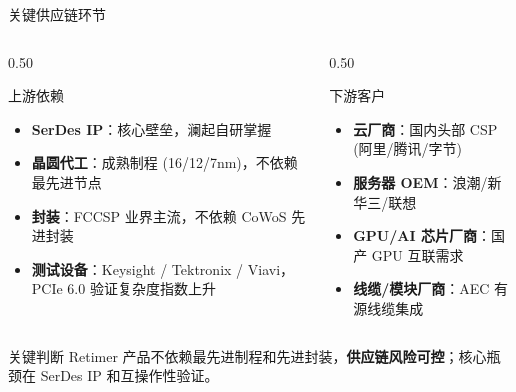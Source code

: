 \documentclass[aspectratio=169, 10pt, UTF8]{ctexbeamer}
\begin{document}
\begin{frame}{关键供应链环节}
  \begin{columns}[T]
    \begin{column}{0.50\textwidth}
      \begin{block}{上游依赖}
        \begin{itemize}
          \item \textbf{SerDes IP}：核心壁垒，澜起自研掌握
          \item \textbf{晶圆代工}：成熟制程 (16/12/7nm)，不依赖最先进节点
          \item \textbf{封装}：FCCSP 业界主流，不依赖 CoWoS 先进封装
          \item \textbf{测试设备}：Keysight / Tektronix / Viavi，PCIe 6.0 验证复杂度指数上升
        \end{itemize}
      \end{block}
    \end{column}
    \begin{column}{0.50\textwidth}
      \begin{exampleblock}{下游客户}
        \begin{itemize}
          \item \textbf{云厂商}：国内头部 CSP (阿里/腾讯/字节)
          \item \textbf{服务器 OEM}：浪潮/新华三/联想
          \item \textbf{GPU/AI 芯片厂商}：国产 GPU 互联需求
          \item \textbf{线缆/模块厂商}：AEC 有源线缆集成
        \end{itemize}
      \end{exampleblock}
    \end{column}
  \end{columns}

  \vspace{8pt}
  \begin{alertblock}{关键判断}
    Retimer 产品不依赖最先进制程和先进封装，\textbf{供应链风险可控}；核心瓶颈在 SerDes IP 和互操作性验证。
  \end{alertblock}
\end{frame}
\end{document}
